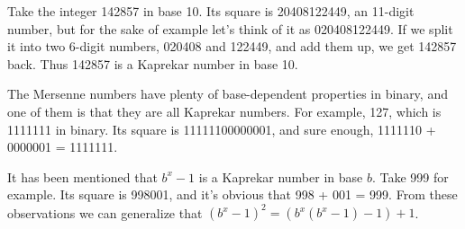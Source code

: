 \documentclass[12pt]{article}
\begin{document}
Take the integer 142857 in base 10. Its square is 20408122449, an 11-digit number, but for the sake of example let's think of it as 020408122449. If we split it into two 6-digit numbers, 020408 and 122449, and add them up, we get 142857 back. Thus 142857 is a Kaprekar number in base 10.

The Mersenne numbers have plenty of base-dependent properties in binary, and one of them is that they are all Kaprekar numbers. For example, 127, which is 1111111 in binary. Its square is 11111100000001, and sure enough, 1111110 + 0000001 = 1111111.

It has been mentioned that $b^x - 1$ is a Kaprekar number in base $b$. Take 999 for example. Its square is 998001, and it's obvious that 998 + 001 = 999. From these observations we can generalize that $(b^x - 1)^2 = (b^x(b^x - 1) - 1) + 1$.
\end{document}
